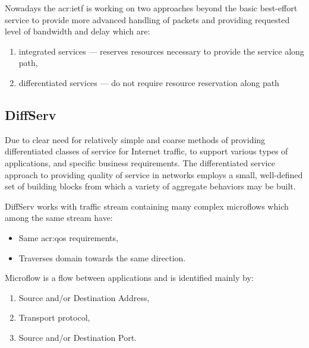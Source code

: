 \documentclass[11pt,openany]{book}
\begin{document}
      Nowadays the \gls{acr:ietf} is working on two approaches beyond the basic best-effort service to provide more
      advanced handling of packets and providing requested level of bandwidth and delay which are:

      \begin{enumerate}
        \item integrated services --- reserves resources necessary to provide the service along path,
        \item differentiated services --- do not require resource reservation along path
      \end{enumerate}


      \subsection{DiffServ}

        Due to clear need for relatively simple and coarse methods of providing differentiated classes of service for
        Internet traffic, to support various types of applications, and specific business requirements. The
        differentiated service approach to providing quality of service in networks employs a small, well-defined set of
        building blocks from which a variety of aggregate behaviors may be built. \cite{qos}

        DiffServ works with traffic stream containing many complex microflows which among the same stream have:

        \begin{itemize}
          \item Same \gls{acr:qos} requirements,
          \item Traverses domain towards the same direction.
        \end{itemize}

        Microflow is a flow between applications and is identified mainly by:

        \begin{enumerate}
          \item Source and/or Destination Address,
          \item Transport protocol,
          \item Source and/or Destination Port.
        \end{enumerate}
\end{document}
